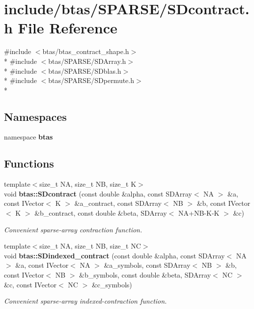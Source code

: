 \section{include/btas/\-S\-P\-A\-R\-S\-E/\-S\-Dcontract.h File Reference}
\label{db/d3c/SDcontract_8h}
{\ttfamily \#include $<$btas/btas\-\_\-contract\-\_\-shape.\-h$>$}\\*
{\ttfamily \#include $<$btas/\-S\-P\-A\-R\-S\-E/\-S\-D\-Array.\-h$>$}\\*
{\ttfamily \#include $<$btas/\-S\-P\-A\-R\-S\-E/\-S\-Dblas.\-h$>$}\\*
{\ttfamily \#include $<$btas/\-S\-P\-A\-R\-S\-E/\-S\-Dpermute.\-h$>$}\\*
\subsection*{Namespaces}
\begin{DoxyCompactItemize}
\item 
namespace {\bf btas}
\end{DoxyCompactItemize}
\subsection*{Functions}
\begin{DoxyCompactItemize}
\item 
{\footnotesize template$<$size\-\_\-t N\-A, size\-\_\-t N\-B, size\-\_\-t K$>$ }\\void {\bf btas\-::\-S\-Dcontract} (const double \&alpha, const S\-D\-Array$<$ N\-A $>$ \&a, const I\-Vector$<$ K $>$ \&a\-\_\-contract, const S\-D\-Array$<$ N\-B $>$ \&b, const I\-Vector$<$ K $>$ \&b\-\_\-contract, const double \&beta, S\-D\-Array$<$ N\-A+N\-B-\/K-\/K $>$ \&c)
\begin{DoxyCompactList}\small\item\em Convenient sparse-\/array contraction function. \end{DoxyCompactList}\item 
{\footnotesize template$<$size\-\_\-t N\-A, size\-\_\-t N\-B, size\-\_\-t N\-C$>$ }\\void {\bf btas\-::\-S\-Dindexed\-\_\-contract} (const double \&alpha, const S\-D\-Array$<$ N\-A $>$ \&a, const I\-Vector$<$ N\-A $>$ \&a\-\_\-symbols, const S\-D\-Array$<$ N\-B $>$ \&b, const I\-Vector$<$ N\-B $>$ \&b\-\_\-symbols, const double \&beta, S\-D\-Array$<$ N\-C $>$ \&c, const I\-Vector$<$ N\-C $>$ \&c\-\_\-symbols)
\begin{DoxyCompactList}\small\item\em Convenient sparse-\/array indexed-\/contraction function. \end{DoxyCompactList}\end{DoxyCompactItemize}
